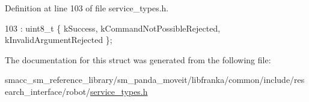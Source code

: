 Definition at line 103 of file service\+\_\+types.\+h.


\begin{DoxyCode}
103 : uint8\_t \{ kSuccess, kCommandNotPossibleRejected, kInvalidArgumentRejected \};
\end{DoxyCode}


The documentation for this struct was generated from the following file\+:\begin{DoxyCompactItemize}
\item 
smacc\+\_\+sm\+\_\+reference\+\_\+library/sm\+\_\+panda\+\_\+moveit/libfranka/common/include/research\+\_\+interface/robot/\hyperlink{service__types_8h}{service\+\_\+types.\+h}\end{DoxyCompactItemize}
